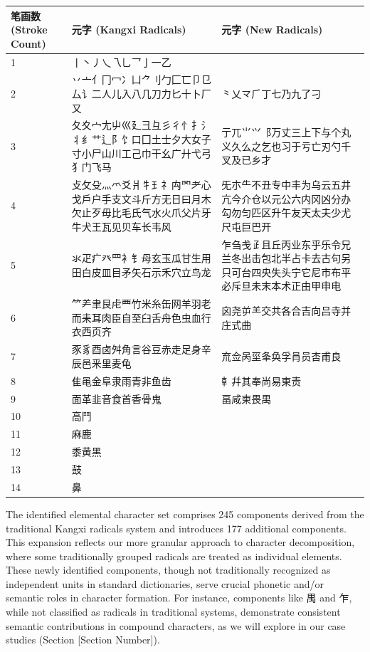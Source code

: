 \documentclass[11pt,letterpaper]{article}
\begin{document}
\begin{longtable}{|p{1.5cm}|p{6.5cm}|p{6.5cm}|}
\hline
\textbf{笔画数 (Stroke Count)} & \textbf{元字 (Kangxi Radicals)} & \textbf{元字 (New Radicals)} \\
\hline
1 & 丨丶丿乀乁乚乛亅一乙 & \\
\hline
2 & 丷亠亻冂冖冫凵⺈刂勹匚匸卩㔾厶讠二人儿入八几刀力匕十卜厂又 &
⺀乂龴⺁丁七乃九了刁 \\
\hline
3 &
夂夊宀尢屮巛廴彐彑彡彳忄扌氵丬纟艹辶阝饣口囗土士夕大女子寸小尸山川工己巾干幺广廾弋弓犭门飞马
& 亍兀⺌⺍⻏万丈三上下与个丸义久么之乞也习于亏亡刃勺千叉及已乡才 \\
\hline
4 &
攴攵殳灬爫爻爿牜⺩礻禸罓耂心戈戶户手支文斗斤方无日曰月木欠止歹毋比毛氏气水火爪父片牙牛犬王瓦见贝车长韦风
&
旡朩⺧不丑专中丰为乌云五井亢今介仓以元公六内冈凶分办勾勿匀匹区升午友天太夫少尤尺屯巨巴开 \\
\hline
5 & 氺疋疒癶罒衤钅母玄玉瓜甘生用田白皮皿目矛矢石示禾穴立鸟龙 &
乍刍戋𤴔且丘丙业东乎乐令兄兰冬出击包北半占卡去古句另只可台四央失头宁它尼市布平必斥旦未末本术正由甲申电 \\
\hline
6 & ⺮⺶聿艮虍覀竹米糸缶网羊羽老而耒耳肉臣自至臼舌舟色虫血行衣西页齐 &
囟尧屰⺷交共各合吉向吕寺并庄式曲 \\
\hline
7 & 豕豸酉卤舛角言谷豆赤走足身辛辰邑釆里麦龟 &
㐬佥呙坙夆奂孚肙员㕻甫良 \\
\hline
8 & 隹黾金阜隶雨青非鱼齿 & 龺幷其奉尚易東责 \\
\hline
9 & 面革韭音食首香骨鬼 & 畐咸柬畏禺 \\
\hline
10 & 高鬥 & \\
\hline
11 & 麻鹿 & \\
\hline
12 & 黍黄黑 & \\
\hline
13 & 鼓 & \\
\hline
14 & 鼻 & \\
\hline
\end{longtable}

The identified elemental character set comprises 245 components derived
from the traditional Kangxi radicals system and introduces 177
additional components. This expansion reflects our more granular
approach to character decomposition, where some traditionally grouped
radicals are treated as individual elements. These newly identified
components, though not traditionally recognized as independent units in
standard dictionaries, serve crucial phonetic and/or semantic roles in
character formation. For instance, components like 禺 and 乍, while not
classified as radicals in traditional systems, demonstrate consistent
semantic contributions in compound characters, as we will explore in our
case studies (Section {[}Section Number{]}).
\end{document}
